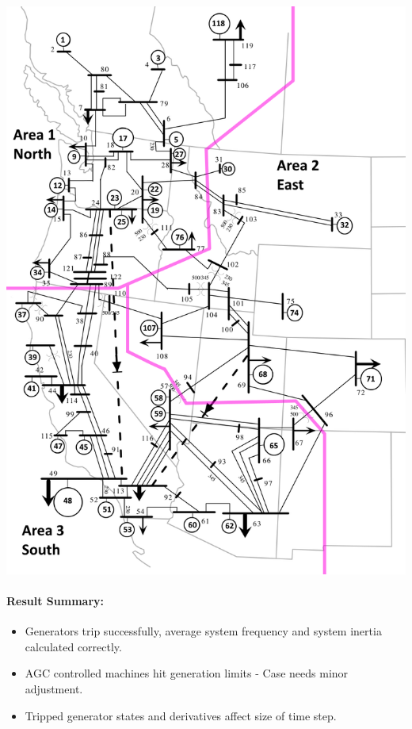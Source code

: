 \documentclass[12pt]{article}
\begin{document}
\begin{minipage}{0.47\linewidth}
\includegraphics[width=.97\linewidth]{miniWECC_split03.png}
\end{minipage}%

\paragraph{Result Summary:}
\begin{itemize}
\item Generators trip successfully, average system frequency and system inertia calculated correctly.
\item AGC controlled machines hit generation limits - Case needs minor adjustment.
\item Tripped generator states and derivatives affect size of time step.
\end{itemize}
\end{document}
